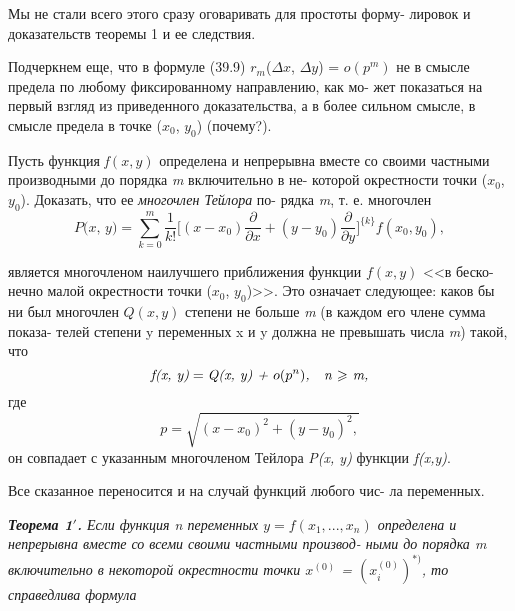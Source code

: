 \documentclass[10pt]{book}
\renewcommand{\geq}{\geqslant}
\begin{document}
\begin{spacing}{0.85}
	   Мы не стали всего этого сразу оговаривать для простоты форму-\linebreak
	   лировок и доказательств теоремы 1 и ее следствия.
		
		Подчеркнем еще, что в формуле (39.9) $r_m$($\Delta x$, $\Delta y$) = $o(p^m)$ \linebreak
		не в смысле предела по любому фиксированному направлению, как мо- \linebreak
		жет показаться на первый взгляд из приведенного доказательства,\linebreak
		а в более сильном смысле, в смысле предела в точке  ($x_0$, $y_0$) (почему?).
	\end{spacing}		
		\setlength{\parskip}{0.05cm}
	\begin{spacing}{0.9}
		\small{ Пусть функция \textit {f}$(x, y)$ определена и непрерывна \linebreak
		вместе со своими частными производными до порядка \textit {m}  включительно в не- \linebreak
		которой окрестности точки ($x_0$, $y_0$). Доказать, что ее \textit {многочлен Тейлора} по- \linebreak рядка \textit {m}, т. е. многочлен \small{
		$$\textit{P(x, y)} = \sum\limits_{k = 0}^m \frac{1}{k!} \bigl[(x- x_0) \frac{\partial}{\partial x} + (y- y_0) \frac{\partial}{\partial y}\bigr]^{\{k\}} \textit {f}(x_0, y_0) ,$$}
	
		\noindent является многочленом наилучшего приближения функции $\textit{f}(x, y)$ <<в беско- \linebreak
		нечно малой окрестности точки ($x_0$, $y_0$)>>. Это означает следующее: каков бы ни \linebreak
		был многочлен $Q(x, y)$ степени не больше \textit {m} (в каждом его члене сумма показа- \linebreak
		телей степени y переменных x и y должна не превышать числа \textit{m}) такой, что
		 \small{	$$\textit {f(x, y)} = \textit{Q(x, y) + $o(p^n)$,\quad n $\geq$ m,}$$}
		\noindent где  \small{ $$p=\sqrt{(x - x_0)^2 + (y-y_0)^2,}$$ } он совпадает с указанным многочленом Тейлора \textit{P(x, y)} функции  \textit{f(x,y)}. 
		}
	\end{spacing}	
	    Все сказанное переносится и на случай функций любого чис- \linebreak
	    ла переменных.
	   
	    \textit{\textbf{Теорема 1$'$.} Если функция n переменных $y = \textit{f}(x_1, ..., x_n)$ \linebreak определена и непрерывна вместе со всеми своими частными производ- \linebreak
	    ными до порядка \textit {m} включительно в некоторой окрестности точки
	    	$x^{(0)}$ = $(x_{i}^{(0)})^{*)}$, то справедлива формула}
	   
\end{document}
